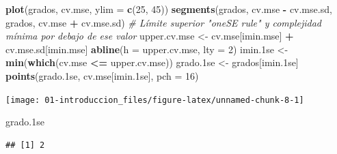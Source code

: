 \documentclass[
]{book}
\newenvironment{Shaded}{\begin{snugshade}}{\end{snugshade}}
\newcommand{\CommentTok}[1]{\textcolor[rgb]{0.56,0.35,0.01}{\textit{#1}}}
\newcommand{\DataTypeTok}[1]{\textcolor[rgb]{0.13,0.29,0.53}{#1}}
\newcommand{\DecValTok}[1]{\textcolor[rgb]{0.00,0.00,0.81}{#1}}
\newcommand{\FloatTok}[1]{\textcolor[rgb]{0.00,0.00,0.81}{#1}}
\newcommand{\KeywordTok}[1]{\textcolor[rgb]{0.13,0.29,0.53}{\textbf{#1}}}
\newcommand{\NormalTok}[1]{#1}
\newcommand{\OperatorTok}[1]{\textcolor[rgb]{0.81,0.36,0.00}{\textbf{#1}}}
\newcommand{\StringTok}[1]{\textcolor[rgb]{0.31,0.60,0.02}{#1}}
\theoremstyle{break}
\theoremstyle{definition}
\theoremstyle{definition}
\theoremstyle{definition}
\theoremstyle{remark}
\begin{document}
\begin{Shaded}
\begin{Highlighting}[]
\KeywordTok{plot}\NormalTok{(grados, cv.mse, }\DataTypeTok{ylim =} \KeywordTok{c}\NormalTok{(}\DecValTok{25}\NormalTok{, }\DecValTok{45}\NormalTok{))}
\KeywordTok{segments}\NormalTok{(grados, cv.mse }\OperatorTok{-}\StringTok{ }\NormalTok{cv.mse.sd, grados, cv.mse }\OperatorTok{+}\StringTok{ }\NormalTok{cv.mse.sd)}
\CommentTok{# Límite superior "oneSE rule" y complejidad mínima por debajo de ese valor}
\NormalTok{upper.cv.mse <-}\StringTok{ }\NormalTok{cv.mse[imin.mse] }\OperatorTok{+}\StringTok{ }\NormalTok{cv.mse.sd[imin.mse]}
\KeywordTok{abline}\NormalTok{(}\DataTypeTok{h =}\NormalTok{ upper.cv.mse, }\DataTypeTok{lty =} \DecValTok{2}\NormalTok{)}
\NormalTok{imin}\FloatTok{.1}\NormalTok{se <-}\StringTok{ }\KeywordTok{min}\NormalTok{(}\KeywordTok{which}\NormalTok{(cv.mse }\OperatorTok{<=}\StringTok{ }\NormalTok{upper.cv.mse))}
\NormalTok{grado}\FloatTok{.1}\NormalTok{se <-}\StringTok{ }\NormalTok{grados[imin}\FloatTok{.1}\NormalTok{se]}
\KeywordTok{points}\NormalTok{(grado}\FloatTok{.1}\NormalTok{se, cv.mse[imin}\FloatTok{.1}\NormalTok{se], }\DataTypeTok{pch =} \DecValTok{16}\NormalTok{)}
\end{Highlighting}
\end{Shaded}

\begin{center}\texttt{[image: 01-introduccion\_files/figure-latex/unnamed-chunk-8-1]} \end{center}

\begin{Shaded}
\begin{Highlighting}[]
\NormalTok{grado}\FloatTok{.1}\NormalTok{se}
\end{Highlighting}
\end{Shaded}

\begin{verbatim}
## [1] 2
\end{verbatim}
\end{document}
